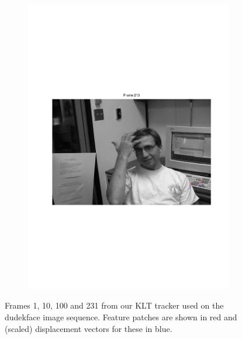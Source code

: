\documentclass[11pt,a4paper]{article}
\begin{document}
\begin{figure}[H]
\begin{subfigure}{0.45\textwidth}
\includegraphics[scale=0.4,trim={70 250 90 250}]{img/tracker_dudekface_213.pdf}
\end{subfigure}
\caption{Frames 1, 10, 100 and 231 from our KLT tracker used on the dudekface image sequence. Feature patches are shown in red and (scaled) displacement vectors for these in blue.}
\label{fig:tracker_dudekface}
\end{figure}
\end{document}
